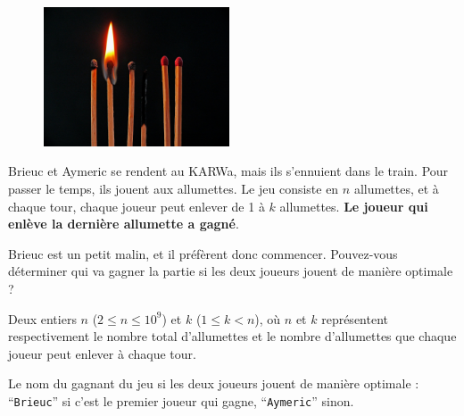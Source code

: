 \problemname{\problemyamlname}


\begin{figure}
	\centering
	\includegraphics[width=5.5cm]{allumettes.jpg}
\end{figure}
Brieuc et Aymeric se rendent au KARWa, mais ils s'ennuient dans le train. Pour passer le temps, ils jouent aux allumettes. Le jeu consiste en $n$ allumettes,
et à chaque tour, chaque joueur peut enlever de 1 à $k$ allumettes. \textbf{Le joueur qui enlève la dernière allumette a gagné}.

Brieuc est un petit malin, et il préfèrent donc commencer. Pouvez-vous déterminer qui va gagner la partie si les deux joueurs jouent de manière optimale ?

\begin{Input}
	Deux entiers $n$ ($2 \le n \le 10^9$) et $k$ ($1 \le k < n$), où $n$ et $k$ représentent respectivement le nombre total d'allumettes et le nombre d'allumettes que chaque joueur peut enlever à chaque tour.
\end{Input}

\begin{Output}
	Le nom du gagnant du jeu si les deux joueurs jouent de manière optimale : ``\verb|Brieuc|'' si c'est le premier joueur qui gagne, ``\verb|Aymeric|'' sinon.
\end{Output}
